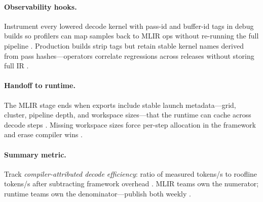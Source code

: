 \paragraph{Observability hooks.} Instrument every lowered decode kernel with pass-id and buffer-id tags in debug builds so profilers can map samples back to MLIR ops without re-running the full pipeline \citep{yirage2026,chen2020compilerbasedhardw,patel2025llminference,memoryfloor2026,taxbreak2026,kwon2023vllm,liu2024deepseekv3,amd2024aie,amd2024xdna,dao2022flashattention,dao2023flashdecoding,nvidia2024cudagraphs,nvidia2022hopper,semianalysis2024tma,dlbook}. Production builds strip tags but retain stable kernel names derived from pass hashes---operators correlate regressions across releases without storing full IR \citep{patel2025llminference,yirage2026,memoryfloor2026,taxbreak2026,chen2020compilerbasedhardw,kwon2023vllm,liu2024deepseekv3,amd2024aie,amd2024xdna,dao2022flashattention,dao2023flashdecoding,nvidia2024cudagraphs,nvidia2022hopper,semianalysis2024tma,dlbook}.


\paragraph{Handoff to runtime.} The MLIR stage ends when exports include stable launch metadata---grid, cluster, pipeline depth, and workspace sizes---that the runtime can cache across decode steps \citep{yirage2026,nvidia2024cudagraphs,chen2020compilerbasedhardw,patel2025llminference,memoryfloor2026,taxbreak2026,kwon2023vllm,liu2024deepseekv3,amd2024aie,amd2024xdna,dao2022flashattention,dao2023flashdecoding,nvidia2022hopper,semianalysis2024tma,dlbook}. Missing workspace sizes force per-step allocation in the framework and erase compiler wins \citep{memoryfloor2026,nvidia2024cudagraphs,yirage2026,taxbreak2026,chen2020compilerbasedhardw,patel2025llminference,kwon2023vllm,liu2024deepseekv3,amd2024aie,amd2024xdna,dao2022flashattention,dao2023flashdecoding,nvidia2022hopper,semianalysis2024tma,dlbook}.


\paragraph{Summary metric.} Track \emph{compiler-attributed decode efficiency}: ratio of measured tokens/s to roofline tokens/s after subtracting framework overhead \citep{patel2025llminference,yirage2026,chen2020compilerbasedhardw,memoryfloor2026,taxbreak2026,kwon2023vllm,liu2024deepseekv3,amd2024aie,amd2024xdna,dao2022flashattention,dao2023flashdecoding,nvidia2024cudagraphs,nvidia2022hopper,semianalysis2024tma,dlbook}. MLIR teams own the numerator; runtime teams own the denominator---publish both weekly \citep{yirage2026,patel2025llminference,memoryfloor2026,taxbreak2026,chen2020compilerbasedhardw,kwon2023vllm,liu2024deepseekv3,amd2024aie,amd2024xdna,dao2022flashattention,dao2023flashdecoding,nvidia2024cudagraphs,nvidia2022hopper,semianalysis2024tma,dlbook}.


